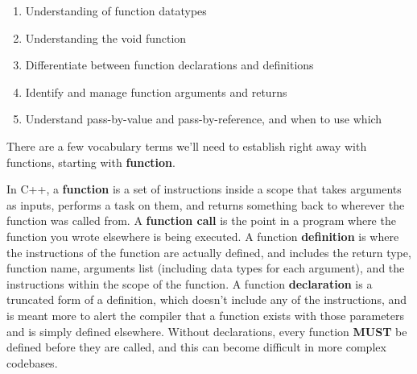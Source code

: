 \begin{Goals}
    \begin{enumerate}
        \item Understanding of function datatypes
        \item Understanding the void function
        \item Differentiate between function declarations and definitions
        \item Identify and manage function arguments and returns
        \item Understand pass-by-value and pass-by-reference, and when to use which
    \end{enumerate}
    \end{Goals}
    
    There are a few vocabulary terms we'll need to establish right away with functions, starting with \textbf{function}.
    
    In C++, a \textbf{function} is a set of instructions inside a scope that takes arguments as inputs, performs a task on them, and returns something back to wherever the function was called from.  A \textbf{function call} is the point in a program where the function you wrote elsewhere is being executed.  A function \textbf{definition} is where the instructions of the function are actually defined, and includes the return type, function name, arguments list (including data types for each argument), and the instructions within the scope of the function.  A function \textbf{declaration} is a truncated form of a definition, which doesn't include any of the instructions, and is meant more to alert the compiler that a function exists with those parameters and is simply defined elsewhere.  Without declarations, every function \textbf{MUST} be defined before they are called, and this can become difficult in more complex codebases.
    
    